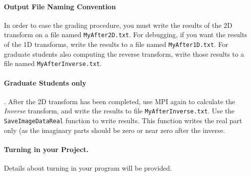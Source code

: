 \documentclass[10pt]{article}
\begin{document}
\paragraph{Output File Naming Convention}
In order to ease the grading procedure, you must write the results of
the 2D transform on a file named {\tt MyAfter2D.txt}.  
For debugging, if you want the results of the 1D transforms, write
the results to a file named {\tt MyAfter1D.txt}.
For graduate students also computing the reverse transform, write those results
to a file named {\tt MyAfterInverse.txt}.

\paragraph {Graduate Students only}.
After the 2D transform has been completed, use MPI again to calculate the
{\em Inverse} transform, and write the results to file {\tt MyAfterInverse.txt}.
Use the {\tt SaveImageDataReal} function to write results. This function writes
the real part only (as the imaginary parts should be zero or near zero after
the inverse.

\paragraph{Turning in your Project.}
Details about turning in your program will be provided.  
\end{document}
